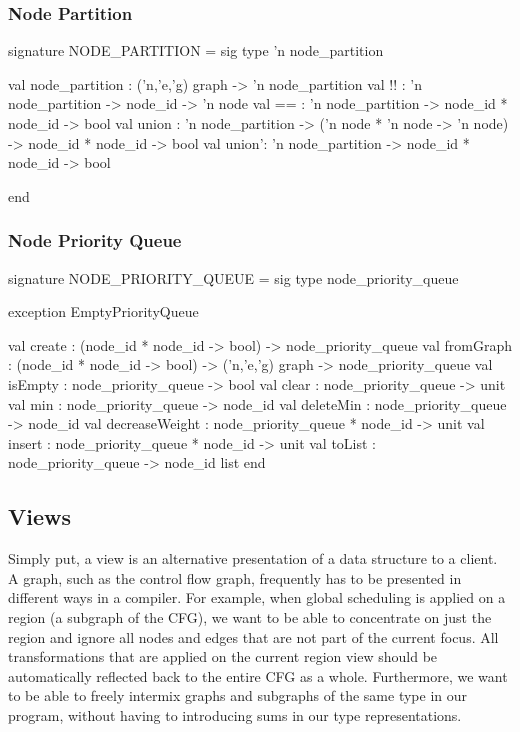 \subsubsection{Node Partition}
\begin{SML}
 signature NODE_PARTITION = sig 
   type 'n node_partition

   val node_partition : ('n,'e,'g) graph -> 'n node_partition
   val !!    : 'n node_partition -> node_id -> 'n node
   val ==    : 'n node_partition -> node_id * node_id -> bool
   val union : 'n node_partition -> ('n node * 'n node -> 'n node) ->
                                        node_id * node_id -> bool
   val union': 'n node_partition -> node_id * node_id -> bool

 end
\end{SML}

\subsubsection{Node Priority Queue}
\begin{SML}
 signature NODE_PRIORITY_QUEUE = sig 
   type node_priority_queue

   exception EmptyPriorityQueue

   val create         : (node_id * node_id -> bool) -> node_priority_queue
   val fromGraph      : (node_id * node_id -> bool) -> 
      ('n,'e,'g) graph -> node_priority_queue
   val isEmpty        : node_priority_queue -> bool
   val clear          : node_priority_queue -> unit
   val min            : node_priority_queue -> node_id
   val deleteMin      : node_priority_queue -> node_id
   val decreaseWeight : node_priority_queue * node_id -> unit
   val insert         : node_priority_queue * node_id -> unit
   val toList         : node_priority_queue -> node_id list
 end
\end{SML}

\subsection{Views}\label{sec:views}
Simply put, a view is an alternative presentation
of a data structure to a client.  A graph, such as the control flow
graph, frequently has to be presented in different ways in a compiler.  
For example, when global scheduling is applied on a region 
(a subgraph of the CFG),
we want to be able to concentrate on just the region and ignore all
nodes and edges that are not part of the current focus.  
All transformations that are applied on the current region view should be
automatically reflected back to the entire CFG as a whole.
Furthermore, we want to be able to freely intermix
graphs and subgraphs of the same type in our program, without having
to introducing sums in our type representations.

